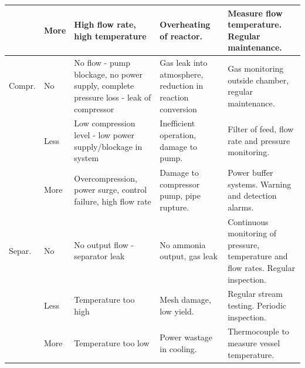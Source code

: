 \documentclass[11pt, a4paper]{article}
\begin{document}
{\begin{landscape}
\begin{table}
\begin{tabular}{|p{1.5cm}|p{1.2cm}|p{5.7cm}|p{5.2cm}|p{8.2cm}|}
				\hline
				& More      & High flow rate, high temperature                                                                      & Overheating of reactor.                                  & Measure flow temperature. Regular maintenance.                                                                                  \\ 
				\hline
				Compr.     & No        & No flow - pump blockage, no power supply, complete pressure loss - leak of compressor                 & Gas leak into atmosphere, reduction in reaction conversion               & Gas monitoring outside chamber, regular maintenance.                                                                               \\ 
				\hline
				& Less      & Low compression level - low power supply/blockage in system                                           & Inefficient operation, damage to pump.                                   & Filter of feed, flow rate and pressure monitoring.                                                                                 \\ 
				\hline
				& More      & Overcompression, power surge, control failure, high flow rate                                         & Damage to compressor pump, pipe rupture. & Power buffer systems. Warning and detection alarms.                                                                                \\ 
				\hline
				Separ.      & No        & No output flow - separator leak                                                                       & No ammonia output, gas leak                                              & Continuous monitoring of pressure, temperature and flow rates. Regular inspection.                                                 \\ 
				\hline
				& Less      & Temperature too high                                                                                  & Mesh damage, low yield.                                       & Regular stream testing. Periodic inspection.                                                                  \\ 
				\hline
				& More      & Temperature too low                                                                                   & Power wastage in cooling.                                        & Thermocouple to measure vessel temperature.                                                                                 \\ 

\end{tabular}
\end{table}
\end{landscape}}
\end{document}
